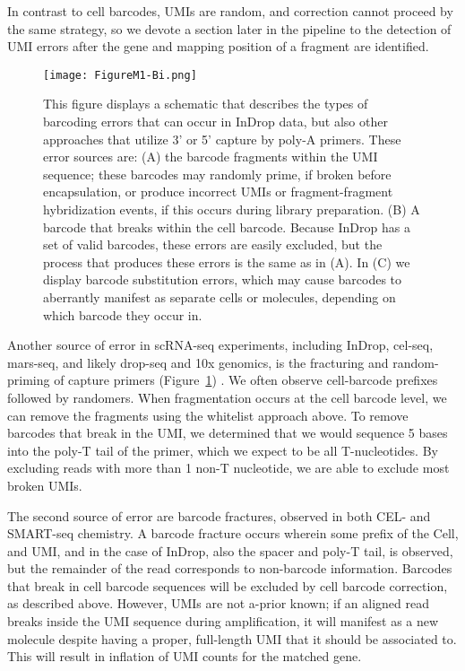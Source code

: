 In contrast to cell barcodes, UMIs are random, and correction cannot proceed by the same strategy, so we devote a section later in the pipeline to the detection of UMI errors after the gene and mapping position of a fragment are identified.

\begin{figure}
\centering
\texttt{[image: FigureM1-Bi.png]}
\caption{This figure displays a schematic that describes the types of barcoding errors that can occur in InDrop data, but also other approaches that utilize 3' or 5' capture by poly-A primers. These error sources are: (A) the barcode fragments within the UMI sequence; these barcodes may randomly prime, if broken before encapsulation, or produce incorrect UMIs or fragment-fragment hybridization events, if this occurs during library preparation. (B) A barcode that breaks within the cell barcode. Because InDrop has a set of valid barcodes, these errors are easily excluded, but the process that produces these errors is the same as in (A). In (C) we display barcode substitution errors, which may cause barcodes to aberrantly manifest as separate cells or molecules, depending on which barcode they occur in.}
\label{fig:m1bi}
\end{figure}

Another source of error in scRNA-seq experiments, including InDrop, cel-seq, mars-seq, and likely drop-seq and 10x genomics, is the fracturing and random-priming of capture primers (Figure~\ref{fig:m1bi}) \citep{Jaitin2014}. 
We often observe cell-barcode prefixes followed by randomers. 
When fragmentation occurs at the cell barcode level, we can remove the fragments using the whitelist approach above. To remove barcodes that break in the UMI, we determined that we would sequence 5 bases into the poly-T tail of the primer, which we expect to be all T-nucleotides. 
By excluding reads with more than 1 non-T nucleotide, we are able to exclude most broken UMIs.

The second source of error are barcode fractures, observed in both CEL- and SMART-seq chemistry. %
A barcode fracture occurs wherein some prefix of the Cell, and UMI, and in the case of InDrop, also the spacer and poly-T tail, is observed, but the remainder of the read corresponds to non-barcode information. 
Barcodes that break in cell barcode sequences will be excluded by cell barcode correction, as described above. 
However, UMIs are not a-prior known; if an aligned read breaks inside the UMI sequence during amplification, it will manifest as a new molecule despite having a proper, full-length UMI that it should be associated to.
This will result in inflation of UMI counts for the matched gene. 

